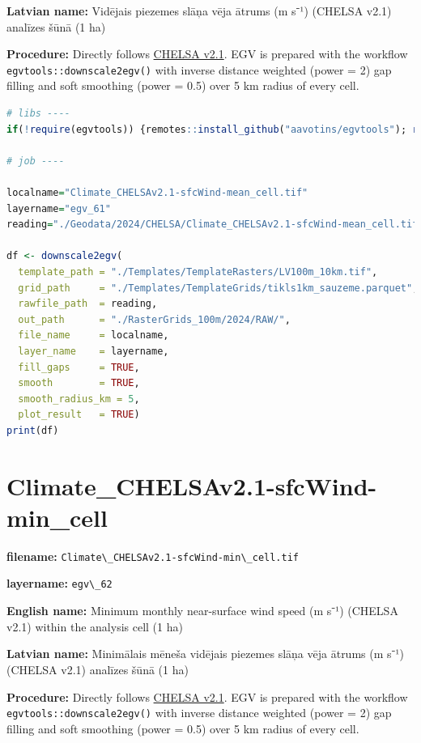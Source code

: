 \documentclass[
]{book}
\newcommand{\passthrough}[1]{#1}
\begin{document}
\textbf{Latvian name:} Vidējais piezemes slāņa vēja ātrums (m s⁻¹) (CHELSA v2.1) analīzes šūnā (1 ha)

\textbf{Procedure:} Directly follows \hyperref[Ch04.11]{CHELSA v2.1}. EGV is prepared with the
workflow \passthrough{\lstinline!egvtools::downscale2egv()!} with inverse distance weighted (power = 2)
gap filling and soft smoothing (power = 0.5) over 5 km radius of every cell.

\begin{lstlisting}[language=R]
# libs ----
if(!require(egvtools)) {remotes::install_github("aavotins/egvtools"); require(egvtools)}

# job ----

localname="Climate_CHELSAv2.1-sfcWind-mean_cell.tif"
layername="egv_61"
reading="./Geodata/2024/CHELSA/Climate_CHELSAv2.1-sfcWind-mean_cell.tif"

df <- downscale2egv(
  template_path = "./Templates/TemplateRasters/LV100m_10km.tif",
  grid_path     = "./Templates/TemplateGrids/tikls1km_sauzeme.parquet",
  rawfile_path  = reading,
  out_path      = "./RasterGrids_100m/2024/RAW/",
  file_name     = localname,
  layer_name    = layername,
  fill_gaps     = TRUE,
  smooth        = TRUE,
  smooth_radius_km = 5,
  plot_result   = TRUE)
print(df)
\end{lstlisting}

\section{Climate\_CHELSAv2.1-sfcWind-min\_cell}\label{ch06.062}

\textbf{filename:} \passthrough{\lstinline!Climate\_CHELSAv2.1-sfcWind-min\_cell.tif!}

\textbf{layername:} \passthrough{\lstinline!egv\_62!}

\textbf{English name:} Minimum monthly near-surface wind speed (m s⁻¹) (CHELSA v2.1) within the analysis cell (1 ha)

\textbf{Latvian name:} Minimālais mēneša vidējais piezemes slāņa vēja ātrums (m s⁻¹) (CHELSA v2.1) analīzes šūnā (1 ha)

\textbf{Procedure:} Directly follows \hyperref[Ch04.11]{CHELSA v2.1}. EGV is prepared with the
workflow \passthrough{\lstinline!egvtools::downscale2egv()!} with inverse distance weighted (power = 2)
gap filling and soft smoothing (power = 0.5) over 5 km radius of every cell.
\end{document}

